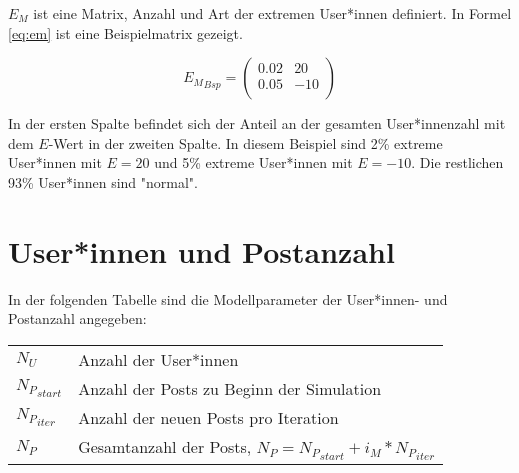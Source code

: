$E_M$ ist eine Matrix, Anzahl und Art der extremen User*innen definiert. In Formel \ref{eq:em} ist eine Beispielmatrix gezeigt.

\begin{equation}
\label{eq:em}
{E_M}_{Bsp} = 
\begin{pmatrix}
0.02 & 20 \\
0.05 & -10 \\
\end{pmatrix}
\end{equation}

In der ersten Spalte befindet sich der Anteil an der gesamten User*innenzahl mit dem $E$-Wert in der zweiten Spalte. In diesem Beispiel sind 2\% extreme User*innen mit $E=20$ und 5\% extreme User*innen mit $E = -10$. Die restlichen 93\% User*innen sind "normal".

\section{User*innen und Postanzahl}

In der folgenden Tabelle sind die Modellparameter der User*innen- und Postanzahl angegeben:

\begin{table}[!htbp]
	\begin{tabularx}{\textwidth}{lX}
		$N_U$&  Anzahl der User*innen\\
		${N_P}_{start}$ & Anzahl der Posts zu Beginn der Simulation \\
		${N_P}_{iter}$ & Anzahl der neuen Posts pro Iteration\\ 
		${N_P}$ & Gesamtanzahl der Posts, $N_P = {N_P}_{start} + i_M * {N_P}_{iter}$
	\end{tabularx}
\end{table}

